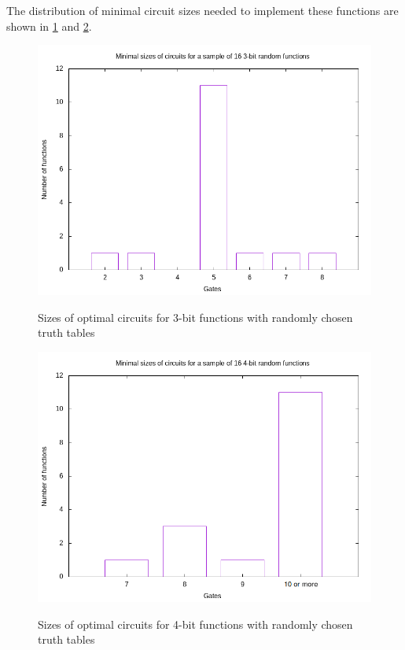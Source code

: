 \documentclass{article}
\begin{document}
The distribution of minimal circuit sizes needed to implement these functions are shown in \ref{fig:3rand_sizes} and \ref{fig:4rand_sizes}.

\begin{figure}[!ht]
  \includegraphics[width=\textwidth]{images/3rand_sizes.png}
  \label{fig:3rand_sizes}
  \caption{Sizes of optimal circuits for 3-bit functions with randomly chosen truth tables}
\end{figure}
\begin{figure}[!ht]
  \includegraphics[width=\textwidth]{images/4rand_sizes.png}
  \label{fig:4rand_sizes}
  \caption{Sizes of optimal circuits for 4-bit functions with randomly chosen truth tables}

\end{figure}
\end{document}
